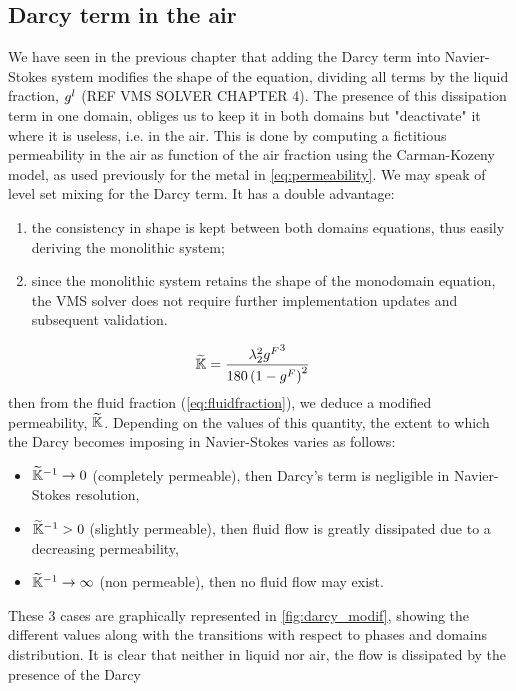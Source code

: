 \subsection{Darcy term in the air}

We have seen in the previous chapter that adding the Darcy term into Navier-Stokes system modifies the shape of the 
equation, dividing all terms by the liquid fraction, ${g^l}$ (REF VMS SOLVER CHAPTER 4). The presence of this dissipation term 
in one domain, obliges us to keep it in both domains but "deactivate" it where it is useless, i.e. in the air.
This is done by computing a fictitious permeability in the air as function of the air fraction using the Carman-Kozeny model,
as used previously for the metal in \cref{eq:permeability}. We may speak of level set mixing for the Darcy term.
It has a double advantage:
\begin{enumerate}
\item the consistency in shape is kept between both domains equations, thus easily deriving the monolithic system;
\item since the monolithic system retains the shape of the monodomain equation, the VMS solver does not require further implementation updates
and subsequent validation.
\end{enumerate}
%
%
\begin{align}
\label{eq:darcy_modif}
&\widetilde{\mathbb{K}} = \frac{{\lambda}_{2}^2 {g^F}^3}{180\left( 1-{g^F} \right)^2}	
\end{align}
then from the fluid fraction (\cref{eq:fluidfraction}), we deduce a modified permeability, $\widetilde{\mathbb{K}}$. 
Depending on the values of this quantity, the extent to which the Darcy becomes imposing in Navier-Stokes varies as follows:
\begin{itemize}
\itemsep0em
\item $\widetilde{\mathbb{K}}^{-1} \rightarrow 0$ (completely permeable), then Darcy's term is negligible in Navier-Stokes resolution,
\item $\widetilde{\mathbb{K}}^{-1} > 0$ (slightly permeable), then fluid flow is greatly dissipated due to a decreasing permeability,
\item $\widetilde{\mathbb{K}}^{-1} \rightarrow \infty$ (non permeable), then no fluid flow may exist.
\end{itemize}
These 3 cases are graphically represented in \cref{fig:darcy_modif}, showing the different values along with the transitions 
with respect to phases and domains distribution. 
It is clear that neither in liquid nor air, the flow is dissipated by the presence of the Darcy
